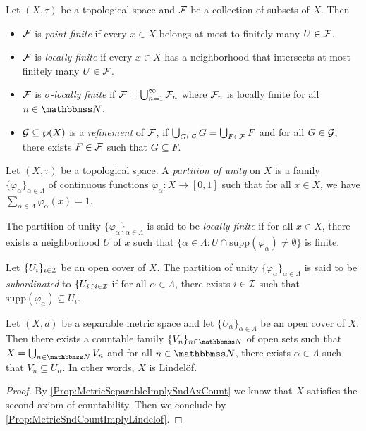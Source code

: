 \documentclass[screen,single]{techreport}
\numberwithin{equation}{section}
\begin{document}
\begin{definition}\label{De:RelatedDefsOfPartiOfUnity}
  Let $(X,\tau)$ be a topological space and $\mathcal{F}$ be a collection of subsets of $X$.
  Then
  \begin{itemize}
    \item $\mathcal{F}$ is \emph{point finite} if every $x \in X$ belongs at most to finitely many $U \in \mathcal{F}$.
    \item $\mathcal{F}$ is \emph{locally finite} if every $x \in X$ has a neighborhood that intersects at most finitely many $U \in \mathcal{F}$.
    \item $\mathcal{F}$ is \emph{$\sigma$-locally finite} if $\mathcal{F} = \bigcup_{n=1}^\infty \mathcal{F}_n$ where $\mathcal{F}_n$ is locally finite for all $n \in \bbN$.
    \item $\mathcal{G} \subseteq \wp(X)$ is a \emph{refinement} of $\mathcal{F}$, if $\bigcup_{G \in \mathcal{G}} G = \bigcup_{F \in \mathcal{F}} F$ and for all $G \in \mathcal{G}$, there exists $F \in \mathcal{F}$ such that $G \subseteq F$.
  \end{itemize}
\end{definition}

\begin{definition}\label{De:PartiOfUnity}
  Let $(X,\tau)$ be a topological space.
  A \emph{partition of unity} on $X$ is a family $\{ \varphi_\alpha \}_{\alpha \in \Lambda}$ of continuous functions $\varphi_\alpha : X \to [0,1]$ such that for all $x \in X$, we have $\sum_{\alpha \in \Lambda} \varphi_\alpha(x) = 1$.
  
  The partition of unity $\{ \varphi_\alpha\}_{\alpha \in \Lambda}$ is said to be \emph{locally finite} if for all $x \in X$, there exists a neighborhood $U$ of $x$ such that $\{ \alpha \in \Lambda : U \cap \mathrm{supp}(\varphi_\alpha) \neq \emptyset \}$ is finite.
  
  Let $\{U_i\}_{i \in \mathcal{I}}$ be an open cover of $X$.
  The partition of unity $\{ \varphi_{\alpha} \}_{\alpha \in \Lambda}$ is said to be \emph{subordinated} to $\{U_i\}_{i \in \mathcal{I}}$ if for all $\alpha \in \Lambda$, there exists $i \in \mathcal{I}$ such that $\mathrm{supp}(\varphi_\alpha) \subseteq U_i$.
\end{definition}

\begin{lemma}\label{Lem:SeparMetricImplyOpenCoverAdmitCountableRefine}
  Let $(X,d)$ be a separable metric space and let $\{U_\alpha\}_{\alpha \in \Lambda}$ be an open cover of $X$.
  Then there exists a countable family $\{V_n\}_{n \in \bbN}$ of open sets such that $X = \bigcup_{n \in \bbN} V_n$ and for all $n \in \bbN$, there exists $\alpha \in \Lambda$ such that $V_n \subseteq U_\alpha$.
  In other words, $X$ is Lindel{\"o}f.
\end{lemma}
\begin{proof}
  By \cref{Prop:MetricSeparableImplySndAxCount} we know that $X$ satisfies the second axiom of countability.
  Then we conclude by \cref{Prop:MetricSndCountImplyLindelof}.
\end{proof}
\end{document}
